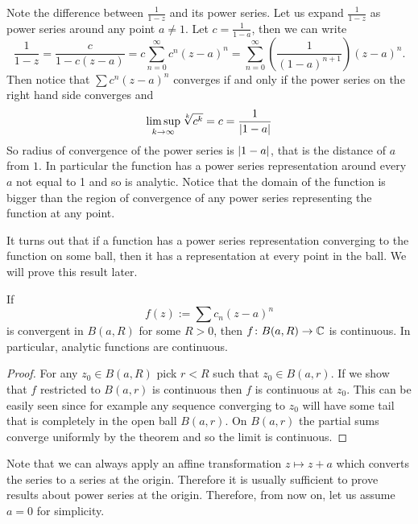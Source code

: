 Note the difference between $\frac{1}{1-z}$ and its power series.  Let us
expand $\frac{1}{1-z}$ as power series around any point $a \not= 1$.
Let $c = \frac{1}{1-a}$, then we can write
\begin{equation*}
\frac{1}{1-z} = 
\frac{c}{1-c(z-a)}
=
c
\sum_{n=0}^\infty c^{n} {(z-a)}^n
=
\sum_{n=0}^\infty \left( \frac{1}{{(1-a)}^{n+1}} \right) {(z-a)}^n .
\end{equation*}
Then notice that $\sum c^n {(z-a)}^n$ converges if and only if 
the power series on the right hand side converges and
\begin{equation*}
\limsup_{k\to\infty}
\sqrt[k]{c^k} = c
= \frac{1}{\lvert {1-a} \rvert}
\end{equation*}
So radius of convergence of the power series is $\lvert {1-a} \rvert$, that is the
distance of $a$ from $1$.  In particular the function has a power series
representation around every $a$ not equal to 1 and so is analytic.
Notice that the domain of the function is bigger than the region
of convergence of any power series representing the function at any point.

It turns out that 
if a function has a power series representation converging to the function
on some ball,
then it has a representation at every point in the ball.  We will prove this
result later.

\begin{prop}
If
\begin{equation*}
f(z) := \sum c_n {(z-a)}^n
\end{equation*}
is convergent in $B(a,R)$ for some $R > 0$, then
$f \colon B(a,R) \to {\mathbb{C}}$ is continuous.
In particular, analytic functions are continuous.
\end{prop}

\begin{proof}
For any $z_0 \in B(a,R)$ pick $r < R$ such that $z_0 \in B(a,r)$.  If we show
that $f$ restricted to $B(a,r)$ is continuous then $f$ is continuous at
$z_0$.  This can be easily seen since for example any sequence converging to
$z_0$ will have some tail that is completely in the open ball $B(a,r)$.  On $B(a,r)$ the
partial sums converge uniformly by the theorem and so the limit is
continuous.
\end{proof}

Note that we can always apply an affine transformation $z \mapsto z+a$ which
converts the series to a series at the origin.  Therefore it is usually
sufficient to prove results about power series at the origin.
Therefore, from now on, let us assume $a=0$ for simplicity.

